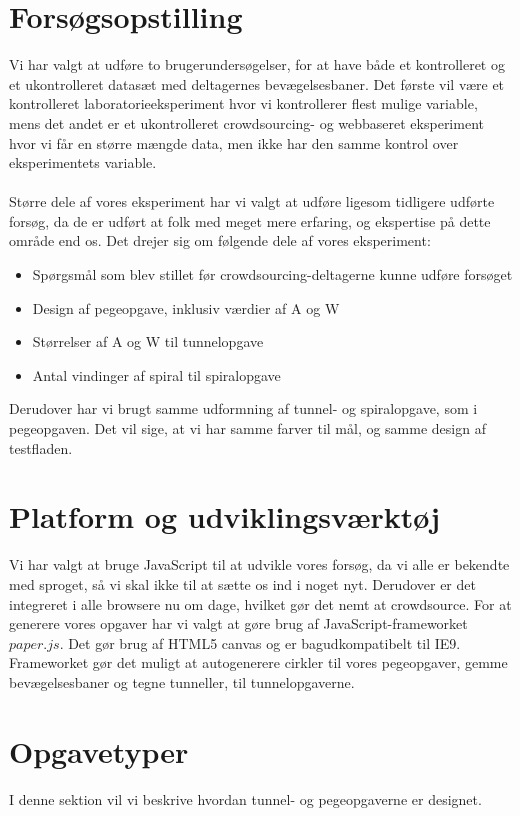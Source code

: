 \section*{Forsøgsopstilling}
Vi har valgt at udføre to brugerundersøgelser, for at have både et kontrolleret og et ukontrolleret datasæt med deltagernes bevægelsesbaner.
Det første vil være et kontrolleret laboratorieeksperiment hvor vi kontrollerer flest mulige variable, mens det andet er et ukontrolleret crowdsourcing- og webbaseret eksperiment hvor vi får en større mængde data, men ikke har den samme kontrol over eksperimentets variable.\\\\
Større dele af vores eksperiment har vi valgt at udføre ligesom tidligere udførte forsøg, da de er udført at folk med meget mere erfaring, og ekspertise på dette område end os.
Det drejer sig om følgende dele af vores eksperiment:
\begin{itemize}
\item Spørgsmål som blev stillet før crowdsourcing-deltagerne kunne udføre forsøget\cite{goldberg2015}
\item Design af pegeopgave, inklusiv værdier af A og W\cite{goldberg2015}
\item Størrelser af A og W til tunnelopgave\cite{accot1997}
\item Antal vindinger af spiral til spiralopgave\cite{accot1997}
\end{itemize}
Derudover har vi brugt samme udformning af tunnel- og spiralopgave, som i pegeopgaven. Det vil sige, at vi har samme farver til mål, og samme design af testfladen.

\section*{Platform og udviklingsværktøj}
Vi har valgt at bruge JavaScript til at udvikle vores forsøg, da vi alle er bekendte med sproget, så vi skal ikke til at sætte os ind i noget nyt. Derudover er det integreret i alle browsere nu om dage, hvilket gør det nemt at crowdsource. For at generere vores opgaver har vi valgt at gøre brug af JavaScript-frameworket $paper.js$. Det gør brug af HTML5 canvas og er bagudkompatibelt til IE9. Frameworket gør det muligt at autogenerere cirkler til vores pegeopgaver, gemme bevægelsesbaner og tegne tunneller, til tunnelopgaverne.

\section*{Opgavetyper}
I denne sektion vil vi beskrive hvordan tunnel- og pegeopgaverne er designet.


